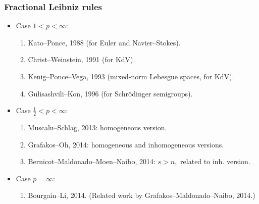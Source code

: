 \documentclass[xcolor=dvipsnames]{beamer}
\begin{document}
\begin{frame}\frametitle{Fractional Leibniz rules}
\begin{itemize}
\item Case $1<p<\infty:$ 
\begin{enumerate}[-]
\item Kato--Ponce, 1988 (for Euler and Navier--Stokes).%

\medskip

\item Christ--Weinstein, 1991 (for KdV).%

\medskip

\item Kenig--Ponce--Vega, 1993 (mixed-norm Lebesgue spaces, for KdV).%

\medskip

\item Gulisashvili--Kon, 1996 (for Schr\"odinger semigroups).

\end{enumerate}

\medskip 

\item Case $\frac{1}{2}<p<\infty:$  
\begin{enumerate}[-]
\item Muscalu--Schlag, 2013: homogeneous version.%

\medskip

\item Grafakos--Oh, 2014: homogeneous and inhomogeneous versions. 

\medskip

\item Bernicot--Maldonado--Moen--Naibo, 2014: $s>n,$ related to inh. version.  

\end{enumerate}

\medskip 

\item Case $p=\infty:$ 
\begin{enumerate}[-]
\item  Bourgain--Li, 2014. (Related work by Grafakos--Maldonado--Naibo, 2014.)
\end{enumerate}
\end{itemize}
\end{frame}
\end{document}
